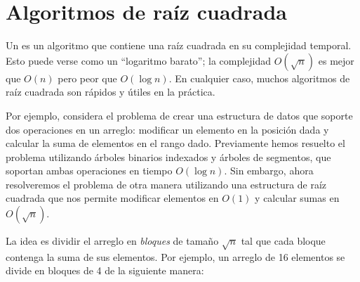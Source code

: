 \chapter{Algoritmos de raíz cuadrada}


Un  es un algoritmo que contiene una raíz
cuadrada en su complejidad temporal. Esto puede verse como un ``logaritmo
barato''; la complejidad $O(\sqrt n)$ es mejor que $O(n)$ pero peor que
$O(\log n)$. En cualquier caso, muchos algoritmos de raíz cuadrada son
rápidos y útiles en la práctica.

Por ejemplo, considera el problema de crear una estructura de datos que
soporte dos operaciones en un arreglo: modificar un elemento en la posición
dada y calcular la suma de elementos en el rango dado. Previamente hemos
resuelto el problema utilizando árboles binarios indexados y árboles de
segmentos, que soportan ambas operaciones en tiempo $O(\log n)$. Sin
embargo, ahora resolveremos el problema de otra manera utilizando una
estructura de raíz cuadrada que nos permite modificar elementos en
$O(1)$ y calcular sumas en $O(\sqrt n)$.

La idea es dividir el arreglo en \emph{bloques} de tamaño $\sqrt n$ tal que
cada bloque contenga la suma de sus elementos. Por ejemplo, un arreglo de
16 elementos se divide en bloques de 4 de la siguiente manera:

\begin{center}
\end{center}

